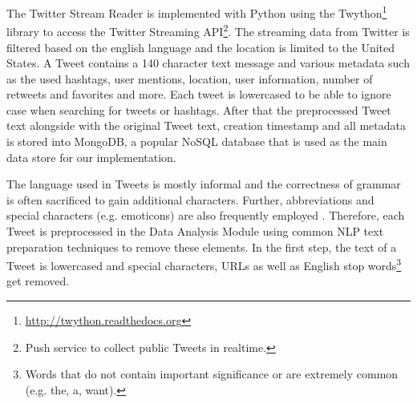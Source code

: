 The Twitter Stream Reader is implemented with Python using the Twython\footnote{\url{http://twython.readthedocs.org} \accessednote} library to access the Twitter Streaming API\footnote{Push service to collect public Tweets in realtime.}. The streaming data from Twitter is filtered based on the english language and the location is limited to the United States. A Tweet contains a 140 character text message and various metadata such as the used hashtags, user mentions, location, user information, number of retweets and favorites and more. Each tweet is lowercased to be able to ignore case when searching for tweets or hashtags. After that the preprocessed Tweet text alongside with the original Tweet text, creation timestamp and all metadata is stored into MongoDB, a popular NoSQL database that is used as the main data store for our implementation.


The language used in Tweets is mostly informal and the correctness of grammar is often sacrificed to gain additional characters. Further, abbreviations and special characters (e.g. emoticons) are also frequently employed \cite[67]{TwitterDataAnalytics2013}. Therefore, each Tweet is preprocessed in the Data Analysis Module using common NLP text preparation techniques to remove these elements. In the first step, the text of a Tweet is lowercased and special characters, URLs as well as English stop words\footnote{Words that do not contain important significance or are extremely common (e.g. the, a, want).} get removed.


